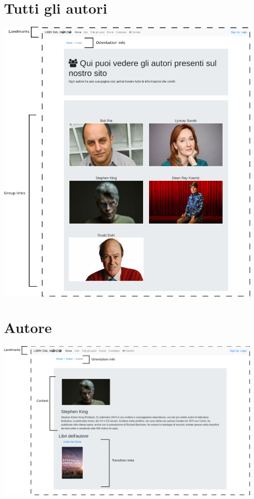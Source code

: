 \documentclass[12pt,a4paper,oneside]{report}
\begin{document}
\section{Tutti gli autori}

\includegraphics[width=1\textwidth]{tutti_autori}

\section{Autore}

\includegraphics[width=1\textwidth]{autore}
\end{document}

